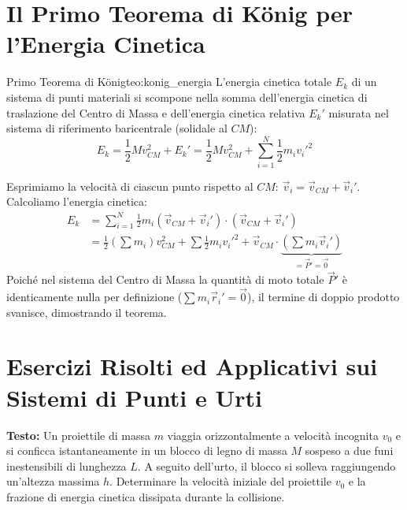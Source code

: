 \section{Il Primo Teorema di König per l'Energia Cinetica}
\label{sec:teorema_konig}

\begin{teorema}{Primo Teorema di König}{teo:konig_energia}
L'energia cinetica totale $E_k$ di un sistema di punti materiali si scompone nella somma dell'energia cinetica di traslazione del Centro di Massa e dell'energia cinetica relativa $E_k'$ misurata nel sistema di riferimento baricentrale (solidale al $CM$):
\begin{equation}
    E_k = \frac{1}{2}M v_{CM}^2 + E_k' = \frac{1}{2}M v_{CM}^2 + \sum_{i=1}^N \frac{1}{2}m_i v_i'^2
    \label{eq:teorema_konig}
\end{equation}
\end{teorema}

\begin{dimostrazione}
Esprimiamo la velocità di ciascun punto rispetto al $CM$: $\vec{v}_i = \vec{v}_{CM} + \vec{v}_i'$. Calcoliamo l'energia cinetica:
\begin{align*}
    E_k &= \sum_{i=1}^N \frac{1}{2}m_i (\vec{v}_{CM} + \vec{v}_i')\cdot(\vec{v}_{CM} + \vec{v}_i') \\
    &= \frac{1}{2}\left(\sum m_i\right)v_{CM}^2 + \sum \frac{1}{2}m_i v_i'^2 + \vec{v}_{CM}\cdot\underbrace{\left(\sum m_i \vec{v}_i'\right)}_{=\vec{P}' = \vec{0}}
\end{align*}
Poiché nel sistema del Centro di Massa la quantità di moto totale $\vec{P}'$ è identicamente nulla per definizione ($\sum m_i \vec{r}_i' = \vec{0}$), il termine di doppio prodotto svanisce, dimostrando il teorema.
\end{dimostrazione}

\section{Esercizi Risolti ed Applicativi sui Sistemi di Punti e Urti}
\label{sec:esercizi_urti}

\begin{esercizio}
\textbf{Testo:}
Un proiettile di massa $m$ viaggia orizzontalmente a velocità incognita $v_0$ e si conficca istantaneamente in un blocco di legno di massa $M$ sospeso a due funi inestensibili di lunghezza $L$. A seguito dell'urto, il blocco si solleva raggiungendo un'altezza massima $h$. Determinare la velocità iniziale del proiettile $v_0$ e la frazione di energia cinetica dissipata durante la collisione.
\end{esercizio}

